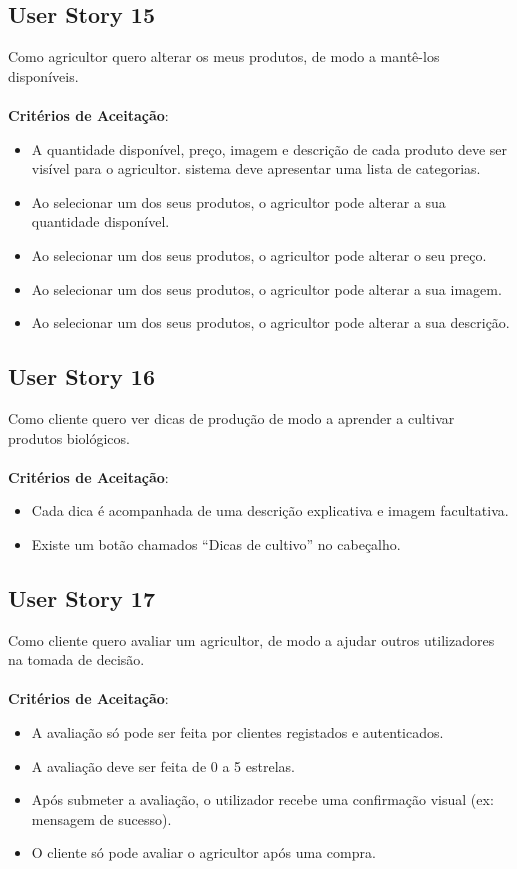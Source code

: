 \documentclass[a4paper,11pt]{article}
\begin{document}
\subsection{User Story 15}
Como agricultor quero alterar os meus produtos, de modo a mantê-los disponíveis.\\\\
\textbf{Critérios de Aceitação}:
\begin{itemize}
  \item A quantidade disponível, preço, imagem e descrição de cada produto deve ser visível para o agricultor. sistema deve apresentar uma lista de categorias.
  \item Ao selecionar um dos seus produtos, o agricultor pode alterar a sua quantidade disponível.
  \item Ao selecionar um dos seus produtos, o agricultor pode alterar o seu preço.
  \item Ao selecionar um dos seus produtos, o agricultor pode alterar a sua imagem.
  \item Ao selecionar um dos seus produtos, o agricultor pode alterar a sua descrição.
\end{itemize}
\subsection{User Story 16}
Como cliente quero ver dicas de produção de modo a aprender a cultivar produtos biológicos.\\\\
\textbf{Critérios de Aceitação}:
\begin{itemize}
  \item Cada dica é acompanhada de uma descrição explicativa e imagem facultativa.
  \item Existe um botão chamados “Dicas de cultivo” no cabeçalho.
\end{itemize}
\subsection{User Story 17}
Como cliente quero avaliar um agricultor, de modo a ajudar outros utilizadores na tomada de decisão.\\\\
\textbf{Critérios de Aceitação}:
\begin{itemize}
  \item A avaliação só pode ser feita por clientes registados e autenticados.
  \item A avaliação deve ser feita de 0 a 5 estrelas.
  \item Após submeter a avaliação, o utilizador recebe uma confirmação visual (ex: mensagem de sucesso).
  \item O cliente só pode avaliar o agricultor após uma compra.
\end{itemize}
\end{document}
